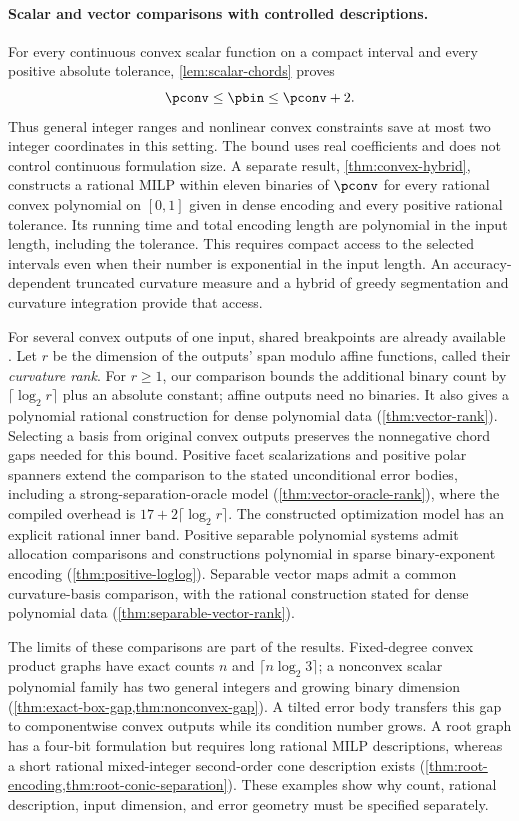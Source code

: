 \paragraph{Scalar and vector comparisons with controlled descriptions.}
For every continuous convex scalar function on a compact interval and
every positive absolute tolerance, \cref{lem:scalar-chords} proves
\[
 \pconv\le\pbin\le\pconv+2.
\]
Thus general integer ranges and nonlinear convex constraints save at most
two integer coordinates in this setting. The bound uses real coefficients
and does not control continuous formulation size. A separate result,
\cref{thm:convex-hybrid}, constructs a rational MILP within eleven binaries
of $\pconv$ for every rational convex polynomial on $[0,1]$ given in dense
encoding and every positive rational tolerance. Its running time and total
encoding length are polynomial in the input length, including the tolerance.
This requires
compact access to the selected intervals even when their number is
exponential in the input length. An accuracy-dependent truncated curvature
measure and a hybrid of greedy segmentation and curvature integration
provide that access.

For several convex outputs of one input, shared breakpoints are already
available \citep{lyu2026}. Let $r$ be the dimension of the outputs' span
modulo affine functions, called their \emph{curvature rank}. For $r\ge1$,
our comparison bounds the additional binary count by $\lceil\log_2r\rceil$
plus an absolute constant; affine outputs need no binaries. It also gives
a polynomial rational construction for dense polynomial data
(\cref{thm:vector-rank}). Selecting a basis from original convex outputs
preserves the nonnegative chord gaps needed for this bound. Positive facet
scalarizations and positive polar spanners extend the comparison to the
stated unconditional error bodies, including a strong-separation-oracle
model (\cref{thm:vector-oracle-rank}), where the compiled overhead is
$17+2\lceil\log_2r\rceil$. The constructed optimization model
has an explicit rational inner band. Positive separable polynomial systems
admit allocation comparisons and constructions polynomial in sparse
binary-exponent encoding (\cref{thm:positive-loglog}). Separable vector
maps admit a common curvature-basis comparison, with the rational
construction stated for dense polynomial data
(\cref{thm:separable-vector-rank}).

The limits of these comparisons are part of the results. Fixed-degree
convex product graphs have exact counts $n$ and $\lceil n\log_2 3\rceil$;
a nonconvex scalar polynomial family has two general integers and growing
binary dimension (\cref{thm:exact-box-gap,thm:nonconvex-gap}). A tilted
error body transfers this gap to componentwise convex outputs while its
condition number grows. A root graph has a four-bit formulation but
requires long rational MILP descriptions, whereas a short rational
mixed-integer second-order cone description exists
(\cref{thm:root-encoding,thm:root-conic-separation}). These examples show why
count, rational description, input dimension, and error geometry must be
specified separately.

